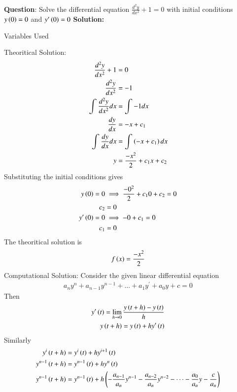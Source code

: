 \documentclass[journal]{IEEEtran}
\begin{document}
\textbf{Question}:\newline
Solve the differential equation $\frac{d^2y}{dx^2} + 1 = 0$ with initial conditions $y\left(0\right) = 0$ and $y^{\prime}\left(0\right) = 0$
\newline
\textbf{Solution: }
\begin{table}[h!]    
  \centering
  
  \caption{Variables Used}
  \label{tab1.1.2.2}
\end{table}
\newline
Theoritical Solution:
\begin{align}
	\frac{d^2y}{dx^2} + 1 &= 0\\
	\frac{d^2y}{dx^2} &= -1\\
	\int_{}^{}\frac{d^2y}{dx^2}dx &= \int_{}^{}-1dx\\
	\frac{dy}{dx} &= -x+c_1\\
	\int_{}^{}\frac{dy}{dx}dx &= \int_{}^{}\left(-x+c_1\right)dx\\
	y &= \frac{-x^2}{2}+{c_1}x+c_2
\end{align}
Substituting the initial conditions gives
\begin{align}
	y\left(0\right) = 0 &\implies \frac{-0^2}{2}+{c_1}0+c_2 = 0\\
	c_2 &= 0\\
	y^{\prime}\left(0\right) = 0 &\implies -0+c_1 = 0\\
	c_1 &= 0
\end{align}
The theoritical solution is 
\begin{align}
	f\left(x\right) = \frac{-x^2}{2}
\end{align}
\newline
Computational Solution:\newline
Consider the given linear differential equation
\begin{align}
	a_{n}y^n + a_{n-1}y^{n-1} + \dots + a_{1}y^\prime + a_{0}y + c = 0
\end{align}
Then
\begin{align}
	y^{\prime}\left(t\right) = \lim_{h\to 0}\frac{y\left(t+h\right) - y\left(t\right)}{h}\\
	y\left(t+h\right) = y\left(t\right) + hy^{\prime}\left(t\right)
\end{align}
Similarly
\begin{align}
	y^{i}\left(t+h\right) &= y^{i}\left(t\right) + hy^{i+1}\left(t\right)\\
	y^{n-1}\left(t+h\right) &= y^{n-1}\left(t\right) + hy^{n}\left(t\right)\\
	y^{n-1}\left(t+h\right) &= y^{n-1}\left(t\right) + h\left(-\frac{a_{n-1}}{a_n}y^{n-1}-\frac{a_{n-2}}{a_n}y^{n-2} - \dots -\frac{a_{0}}{a_n}y - \frac{c}{a_n}\right)
\end{align}
\end{document}
